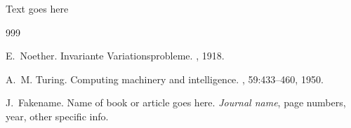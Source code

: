 \documentclass[12pt, a4paper,twoside]{report}
\theoremstyle{plain} %
\theoremstyle{definition} %
\theoremstyle{remark} %
\numberwithin{equation}{chapter}
\begin{document}
Text goes here




\begin{thebibliography}{999} %


E.~Noether.
\newblock Invariante {V}ariationsprobleme.
, 1918.

A.~M. Turing.
\newblock Computing machinery and intelligence.
, 59:433--460, 1950.

J.~Fakename.
\newblock Name of book or article goes here.
\newblock \emph{Journal name}, page numbers, year, other specific info.

\end{thebibliography}
\end{document}
